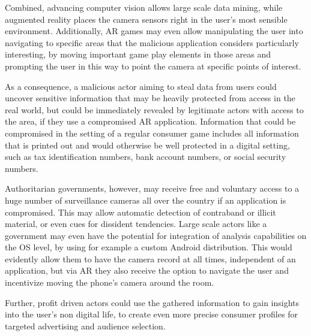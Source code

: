 Combined, advancing computer vision allows large scale data mining, while augmented reality places the camera sensors right in the user's most sensible environment.
Additionally, AR games may even allow manipulating the user into navigating to specific areas that the malicious application considers particularly interesting, by moving important game play elements in those areas and prompting the user in this way to point the camera at specific points of interest.

As a consequence, a malicious actor aiming to steal data from users could uncover sensitive information that may be heavily protected from access in the real world, but could be immediately revealed by legitimate actors with access to the area, if they use a compromised AR application.
Information that could be compromised in the setting of a regular consumer game includes all information that is printed out and would otherwise be well protected in a digital setting, such as tax identification numbers, bank account numbers, or social security numbers.

Authoritarian governments, however, may receive free and voluntary access to a huge number of surveillance cameras all over the country if an application is compromised. This may allow automatic detection of contraband or illicit material, or even cues for dissident tendencies. Large scale actors like a government may even have the potential for integration of analysis capabilities on the OS level, by using for example a custom Android distribution.
This would evidently allow them to have the camera record at all times, independent of an application, but via AR they also receive the option to navigate the user and incentivize moving the phone's camera around the room.

Further, profit driven actors could use the gathered information to gain insights into the user's non digital life, to create even more precise consumer profiles for targeted advertising and audience selection.

